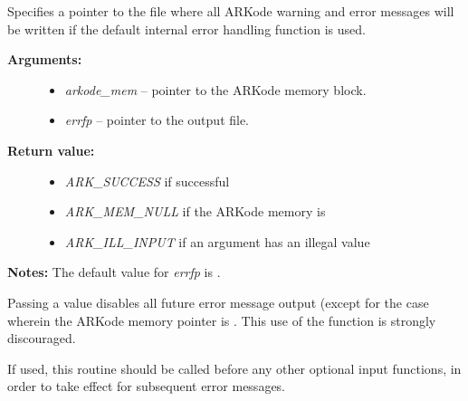 \documentclass[letterpaper,10pt,english]{sphinxmanual}
\begin{document}
\begin{fulllineitems}
\label{c_interface/User_callable:ARKodeSetErrFile}
Specifies a pointer to the file where all ARKode warning and error
messages will be written if the default internal error handling
function is used.
\begin{description}
\item[{\textbf{Arguments:}}] \leavevmode\begin{itemize}
\item {} 
\emph{arkode\_mem} -- pointer to the ARKode memory block.

\item {} 
\emph{errfp} -- pointer to the output file.

\end{itemize}

\item[{\textbf{Return value:}}] \leavevmode\begin{itemize}
\item {} 
\emph{ARK\_SUCCESS} if successful

\item {} 
\emph{ARK\_MEM\_NULL} if the ARKode memory is 

\item {} 
\emph{ARK\_ILL\_INPUT} if an argument has an illegal value

\end{itemize}

\end{description}

\textbf{Notes:} The default value for \emph{errfp} is .

Passing a  value disables all future error message output
(except for the case wherein the ARKode memory pointer is
.  This use of the function is strongly discouraged.

If used, this routine should be called before any other
optional input functions, in order to take effect for subsequent
error messages.

\end{fulllineitems}

\end{document}
